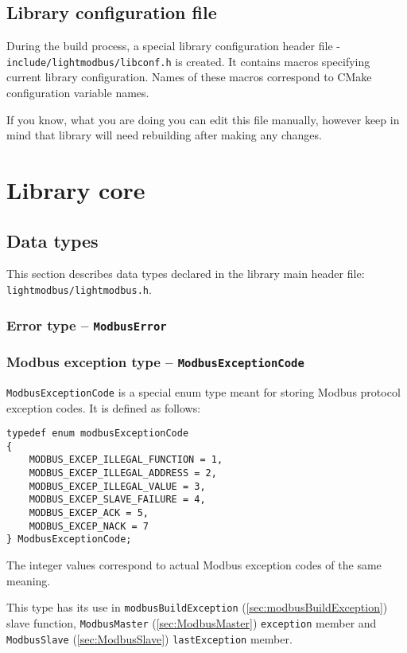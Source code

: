 \documentclass[11pt,a4paper]{article}
\newcommand{\coderef}[1]{\texttt{{#1}} (\ref{sec:#1})}
\begin{document}
\subsection{Library configuration file} \label{sec:libconf}
During the build process, a special library configuration header file - \texttt{include/lightmodbus/libconf.h} is created. It contains macros specifying current library configuration. Names of these macros correspond to CMake configuration variable names.
\par If you know, what you are doing you can edit this file manually, however keep in mind that library will need rebuilding after making any changes.


\section{Library core}

\subsection{Data types}
This section describes data types declared in the library main header file: \texttt{lightmodbus/lightmodbus.h}. 

\subsubsection{Error type -- \texttt{ModbusError}} \label{sec:ModbusError}


\subsubsection{Modbus exception type -- \texttt{ModbusExceptionCode}} \label{sec:ModbusExceptionCode}
\texttt{ModbusExceptionCode} is a special enum type meant for storing Modbus protocol exception codes.
It is defined as follows:

\begin{lstlisting}
typedef enum modbusExceptionCode
{
	MODBUS_EXCEP_ILLEGAL_FUNCTION = 1,
	MODBUS_EXCEP_ILLEGAL_ADDRESS = 2,
	MODBUS_EXCEP_ILLEGAL_VALUE = 3,
	MODBUS_EXCEP_SLAVE_FAILURE = 4,
	MODBUS_EXCEP_ACK = 5,
	MODBUS_EXCEP_NACK = 7
} ModbusExceptionCode;
\end{lstlisting}

The integer values correspond to actual Modbus exception codes of the same meaning.\newline

This type has its use in \coderef{modbusBuildException} slave function, \coderef{ModbusMaster} \texttt{exception} member and \coderef{ModbusSlave} \texttt{lastException} member.
\end{document}
